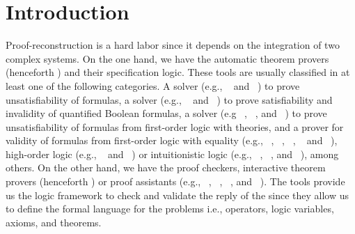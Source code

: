 \documentclass[../main.tex]{subfiles}
\begin{document}

\section{Introduction}
\label{sec:introduction}

Proof-reconstruction is a hard labor since it depends on the
integration of two complex systems. On the one hand, we have the
automatic theorem provers (henceforth \ATP) and their specification
logic. These tools are usually classified in at least one of the
following categories.
A \SAT solver (e.g., ~\cite{Moskewicz2001} and
~\cite{Een2004}) to prove unsatisfiability of \CNF
formulas, a  solver (e.g.,
~\cite{Klieber2014} and
~\cite{Lonsing2017}) to prove satisfiability and
invalidity of quantified Boolean formulas, a \SMT solver
(e.g ~\cite{Barrett2011}, ~\cite{bouton2009},
and ~\cite{DeMoura2008}) to prove unsatisfiability of
formulas from first-order logic with theories, and a prover for
validity of formulas from first-order logic with equality
(e.g., ~\cite{Schulz:AICOM-2002},
~\cite{Otten2008},
\Metis~\cite{hurd2003first},
~\cite{Weidenbach2009} and
~\cite{Riazanov1999}), high-order logic (e.g.,
~\cite{Benzmuller2008} and
~\cite{Brown2012}) or intuitionistic logic (e.g.,
~\cite{Otten2008},
~\cite{Schmitt2001}, and
~\cite{Tammet1997}), among others. On the other hand,
we have the proof checkers, interactive theorem provers (henceforth
\ITP) or proof assistants (e.g., \Agda~\cite{agdateam},
~\cite{coqteam},
~\cite{paulson1994isabelle}, and
~\cite{norrish2007hol}). The \ITP tools provide us the
logic framework to check and validate the reply of the \ATPs since
they allow us to define the formal language for the problems i.e.,
operators, logic variables, axioms, and theorems.
\end{document}
